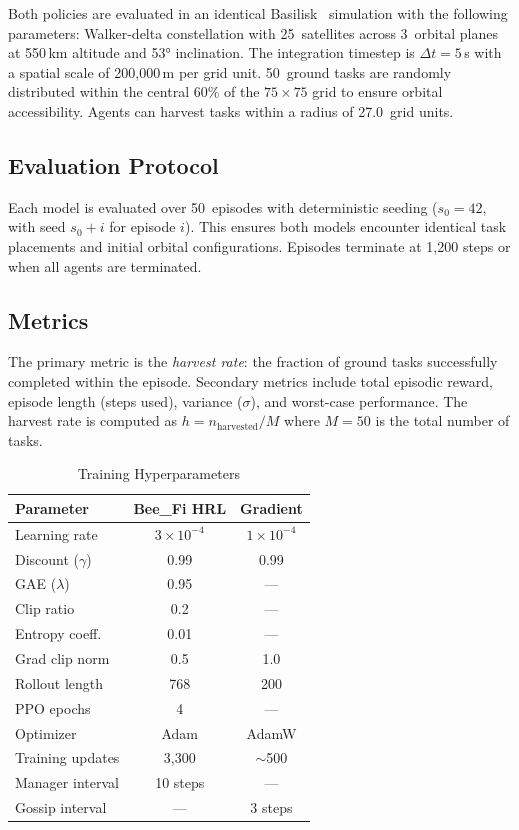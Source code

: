 \documentclass[conference]{IEEEtran}
\begin{document}
Both policies are evaluated in an identical Basilisk~\cite{kenneally2020basilisk} simulation with the following parameters: Walker-delta constellation with 25~satellites across 3~orbital planes at 550\,km altitude and 53° inclination. The integration timestep is $\Delta t = 5$\,s with a spatial scale of 200{,}000\,m per grid unit. 50~ground tasks are randomly distributed within the central 60\% of the $75 \times 75$ grid to ensure orbital accessibility. Agents can harvest tasks within a radius of 27.0~grid units.

\subsection{Evaluation Protocol}

Each model is evaluated over 50~episodes with deterministic seeding ($s_0 = 42$, with seed $s_0 + i$ for episode $i$). This ensures both models encounter identical task placements and initial orbital configurations. Episodes terminate at 1{,}200 steps or when all agents are terminated.

\subsection{Metrics}

The primary metric is the \textit{harvest rate}: the fraction of ground tasks successfully completed within the episode. Secondary metrics include total episodic reward, episode length (steps used), variance ($\sigma$), and worst-case performance. The harvest rate is computed as $h = n_{\text{harvested}} / M$ where $M = 50$ is the total number of tasks.

\begin{table}[t]
\centering
\caption{Training Hyperparameters}
\label{tab:hyperparams}
\begin{tabular}{@{}lcc@{}}
\toprule
\textbf{Parameter} & \textbf{Bee\_Fi HRL} & \textbf{Gradient} \\
\midrule
Learning rate & $3 \times 10^{-4}$ & $1 \times 10^{-4}$ \\
Discount ($\gamma$) & 0.99 & 0.99 \\
GAE ($\lambda$) & 0.95 & --- \\
Clip ratio & 0.2 & --- \\
Entropy coeff. & 0.01 & --- \\
Grad clip norm & 0.5 & 1.0 \\
Rollout length & 768 & 200 \\
PPO epochs & 4 & --- \\
Optimizer & Adam & AdamW \\
Training updates & 3{,}300 & $\sim$500 \\
Manager interval & 10 steps & --- \\
Gossip interval & --- & 3 steps \\
\bottomrule
\end{tabular}
\end{table}
\end{document}
